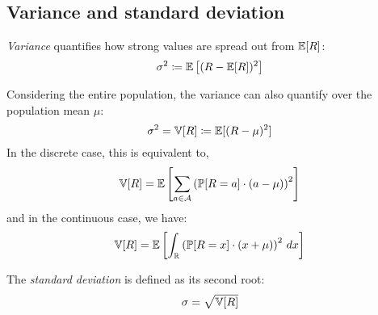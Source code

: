 \subsection{Variance and standard deviation}
\label{sec:bp-var-sd}
%
\begin{definition}
  \emph{Variance} quantifies how strong values are spread out from $\mathbb E[R]$: %
  \[ \sigma^2 \coloneqq \mathbb E\left[(R - \mathbb E[R])^2\right] \]
\end{definition}
Considering the entire population, the variance can also quantify over the population mean $\mu$:
\[ \sigma^2 = \mathbb V[R] \coloneqq \mathbb E[(R - \mu)^2] \]
In the discrete case, this is equivalent to,
\[ \mathbb V[R] = \mathbb E\left[\sum_{a \in \mathcal A} \left(\mathbb P[R=a] \cdot (a - \mu)\right)^2\right] \]
and in the continuous case, we have:
\[ \mathbb V[R] = \mathbb E\left[\int_{\mathbb R} \left(\mathbb P[R=x] \cdot (x + \mu)\right)^2 \, dx\right] \]
\begin{definition}
  The \emph{standard deviation} is defined as its second root:
  \[ \sigma = \sqrt{\mathbb V[R]} \]
\end{definition}

